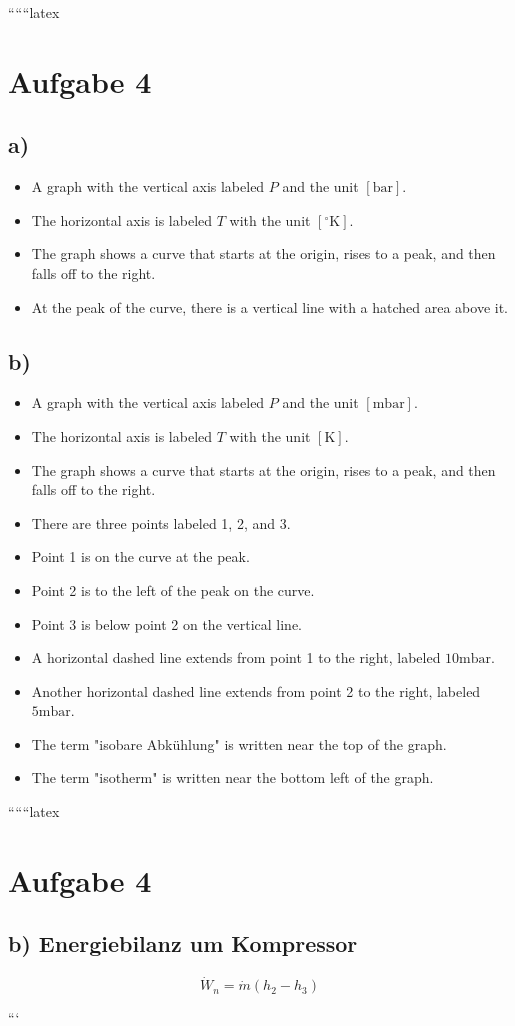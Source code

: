 
``````latex


\section*{Aufgabe 4}

\subsection*{a)}

\begin{itemize}
    \item A graph with the vertical axis labeled \( P \) and the unit \([ \text{bar} ]\).
    \item The horizontal axis is labeled \( T \) with the unit \([ ^\circ \text{K} ]\).
    \item The graph shows a curve that starts at the origin, rises to a peak, and then falls off to the right.
    \item At the peak of the curve, there is a vertical line with a hatched area above it.
\end{itemize}

\subsection*{b)}

\begin{itemize}
    \item A graph with the vertical axis labeled \( P \) and the unit \([ \text{mbar} ]\).
    \item The horizontal axis is labeled \( T \) with the unit \([ \text{K} ]\).
    \item The graph shows a curve that starts at the origin, rises to a peak, and then falls off to the right.
    \item There are three points labeled 1, 2, and 3.
    \item Point 1 is on the curve at the peak.
    \item Point 2 is to the left of the peak on the curve.
    \item Point 3 is below point 2 on the vertical line.
    \item A horizontal dashed line extends from point 1 to the right, labeled \( 10 \text{mbar} \).
    \item Another horizontal dashed line extends from point 2 to the right, labeled \( 5 \text{mbar} \).
    \item The term "isobare Abkühlung" is written near the top of the graph.
    \item The term "isotherm" is written near the bottom left of the graph.
\end{itemize}

``````latex


\section*{Aufgabe 4}

\subsection*{b) Energiebilanz um Kompressor}

\[
\dot{W}_n = \dot{m} (h_2 - h_3)
\]

```